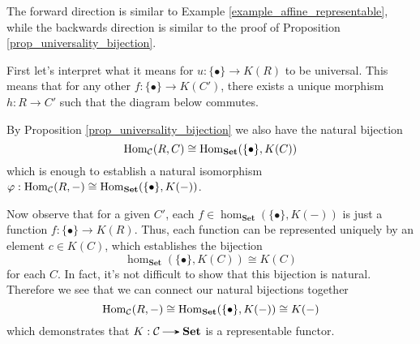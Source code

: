     \begin{prf}
        The forward direction is similar to Example \ref{example_affine_representable}, while 
        the backwards direction is similar to the proof of Proposition \ref{prop_universality_bijection}.

        First let's interpret what it means for $u: \{\bullet\} \to K(R)$ to 
        be universal. This means that for any other $f: \{\bullet\} \to K(C')$, there 
        exists a unique morphism $h: R \to C'$ such that the diagram below commutes. 
        \begin{center}
            \hspace{1cm}
        \end{center}
        By Proposition \ref{prop_universality_bijection} we also have the natural 
        bijection 
        \[
            \operatorname{\mathrm{Hom}}_{\mathcal{C}}(R, C) \cong \operatorname{\mathrm{Hom}}_{\textbf{Set}}(\{\bullet\}, K(C))   
        \]
        which is enough to establish a natural isomorphism 
        $\varphi: \operatorname{\mathrm{Hom}}_{\mathcal{C}}(R, -) \cong \operatorname{\mathrm{Hom}}_{\textbf{Set}}(\{\bullet\}, K(-))$. 
        
        Now observe that for a given $C'$, each $f \in \hom_{\textbf{Set}}(\{\bullet\}, K(-))$
        is just a function $f: \{\bullet\} \to K(R)$. Thus, each function can be represented 
        uniquely by an element $c \in K(C)$, which establishes the bijection 
        \[
            \hom_{\textbf{Set}}(\{\bullet\}, K(C)) \cong K(C)
        \]
        for each $C$. In fact, it's not difficult to show that  
        this bijection is natural.
        Therefore we see that we can connect our natural 
        bijections together
        \[
            \operatorname{\mathrm{Hom}}_{\mathcal{C}}(R, -) \cong \operatorname{\mathrm{Hom}}_{\textbf{Set}}(\{\bullet\}, K(-)) \cong K(-)
        \]
        which demonstrates that $K: \cc \to \textbf{Set}$ is a representable functor. 


\end{prf}
